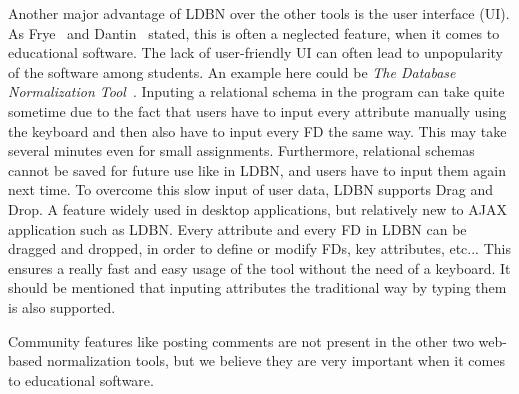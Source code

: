 Another major advantage of LDBN over the other tools is the user interface (UI). 
As Frye~\cite{p10} and Dantin~\cite{p9} stated, this is often a
neglected feature, when it comes to educational software. The lack of user-friendly UI 
can often lead to unpopularity of the software among students. An example here could be 
\textit{The Database Normalization Tool}~\cite{w1}. Inputing a relational schema in the program can
take quite sometime due to the fact that
users have to input every attribute manually using the keyboard and then also 
have to input every FD the same way. This may take several minutes even for small  
assignments. Furthermore, relational schemas cannot be saved for future use like 
in LDBN, and users have to input them again next time. To overcome this slow input of user data, 
LDBN supports Drag and Drop. A feature widely used in desktop
applications, but relatively new to AJAX application such as LDBN. Every attribute
and every FD in LDBN can be dragged and dropped, in order 
to define or modify FDs, key attributes, etc... This ensures a really fast and easy
usage of the tool without the need of a keyboard. It should be mentioned
that inputing attributes the traditional way by typing them is also supported.

Community features like posting comments are not present in the other two web-based 
normalization tools, but we believe they are very important when it comes to educational
software. 

